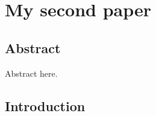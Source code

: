 \chapter{My second paper}
\clearpage

\section*{Abstract}
Abstract here.

\cleardoublepage

\section{Introduction}
\lipsum